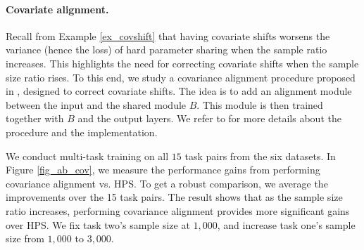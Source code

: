 \paragraph{Covariate alignment.}
Recall from Example \ref{ex_covshift} that having covariate shifts worsens the variance (hence the loss) of hard parameter sharing when the sample ratio increases.
This highlights the need for correcting covariate shifts when the sample size ratio rises.
To this end, we study a covariance alignment procedure proposed in \cite{WZR20}, designed to correct covariate shifts.
The idea is to add an alignment module between the input and the shared module $B$.
This module is then trained together with $B$ and the output layers. We refer to \cite{WZR20} for more details about the procedure and the implementation.

We conduct multi-task training on all $15$ task pairs from the six datasets.
In Figure \ref{fig_ab_cov}, we measure the performance gains from performing covariance alignment vs. HPS.
To get a robust comparison, we average the improvements over the 15 task pairs.
The result shows that as the sample size ratio increases, performing covariance alignment provides more significant gains over HPS.
We fix task two's sample size at $1,000$, and increase task one's sample size from $1,000$ to $3,000$.









